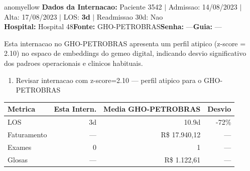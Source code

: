 \documentclass[a4paper,10pt]{article}
\begin{document}
\begin{anomalycard}[Internacao 59189 | GHO-PETROBRAS | MODERADO (z=2.10)]{anomyellow}
\textbf{Dados da Internacao:} Paciente 3542 $\mid$ Admissao: 14/08/2023 $\mid$ Alta: 17/08/2023 $\mid$ LOS: \textbf{3d} $\mid$ Readmissao 30d: Nao\\
\textbf{Hospital:} Hospital 48\quad\textbf{Fonte:} GHO-PETROBRAS\quad\textbf{Senha:} ---\quad\textbf{Guia:} ---\\
\vspace{2pt}\begin{tcolorbox}[colback=severityred!20,colframe=anomyellow,title={\textbf{Interpretacao de Negocio}},fonttitle=\bfseries\small,left=4pt,right=4pt,top=3pt,bottom=3pt]
{\small Esta internacao no GHO-PETROBRAS apresenta um perfil atipico (z-score = 2.10) no espaco de embeddings do gemeo digital, indicando desvio significativo dos padroes operacionais e clinicos habituais.}
\end{tcolorbox}
\begin{tcolorbox}[colback=severityyellow!30,colframe=anomorange,title={\textbf{Recomendacoes Especificas}},fonttitle=\bfseries\small,left=4pt,right=4pt,top=3pt,bottom=3pt]
\begin{enumerate}[nosep,leftmargin=16pt]
\item {\small Revisar internacao com z-score=2.10 --- perfil atipico para o GHO-PETROBRAS}
\end{enumerate}
\end{tcolorbox}
\begin{center}\begin{tabular}{l r r r}\toprule\textbf{Metrica} & \textbf{Esta Intern.} & \textbf{Media GHO-PETROBRAS} & \textbf{Desvio} \\\midrule
LOS & 3d & 10.9d & -72\% \\
Faturamento & --- & R\$ 17.940,12 & --- \\
Exames & 0 & 1 & --- \\
Glosas & --- & R\$ 1.122,61 & --- \\
\bottomrule\end{tabular}\end{center}


\end{anomalycard}
\end{document}
